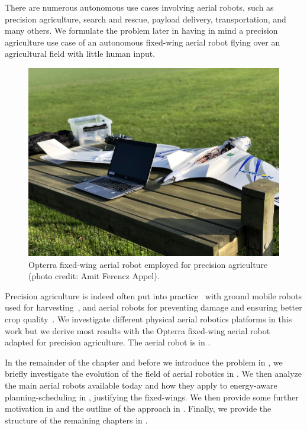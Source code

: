There are numerous autonomous use cases involving aerial robots, such as precision agriculture, search and rescue, payload delivery, transportation, and many others. We formulate the problem later in  having in mind a precision agriculture use case of an autonomous fixed-wing aerial robot flying over an agricultural field with little human input.
\begin{figure}[t]
  \centering
  \includegraphics[width=.7\textwidth]{pictures/photo}
  \caption[Opterra fixed-wing aerial robot]{Opterra fixed-wing aerial robot employed for precision agriculture {\scriptsize(photo credit: Amit Ferencz Appel)}.}
  \label{fig:opterra}
\end{figure}
Precision agriculture is indeed often put into practice~\citep{hajjaj2014review} with ground mobile robots used for harvesting~\citep{qingchun2012study,dong2011development, de2011design, aljanobi2010setup, li2008analysis, edan2000robotic}, and aerial robots for preventing damage and ensuring better crop quality~\citep{puri2017agriculture, daponte2019review}. We investigate different physical aerial robotics platforms in this work but we derive most results with the Opterra fixed-wing aerial robot~\citep{opterra} adapted for precision agriculture. The aerial robot is in .

In the remainder of the chapter and before we introduce the problem in , we briefly investigate the evolution of the field of aerial robotics in . We then analyze the main aerial robots available today and how they apply to energy-aware planning-scheduling in , justifying the fixed-wings. We then provide some further motivation in  and the outline of the approach in . Finally, we provide the structure of the remaining chapters in .

